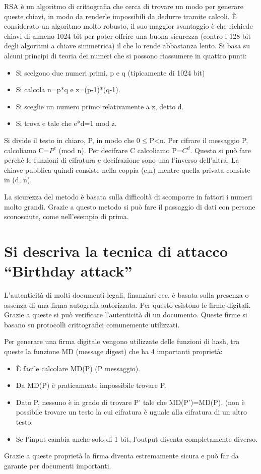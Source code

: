 RSA è un algoritmo di crittografia che cerca di trovare un modo per generare queste chiavi, in modo da renderle impossibili da dedurre tramite calcoli.
È considerato un algoritmo molto robusto, il suo maggior svantaggio è che richiede chiavi di almeno 1024 bit per poter offrire una buona sicurezza (contro i 128 bit degli algoritmi a chiave simmetrica) il che lo rende abbastanza lento.
Si basa su alcuni principi di teoria dei numeri che si possono riassumere in quattro punti:
\begin{itemize}
\item	Si scelgono due numeri primi, p e q (tipicamente di 1024 bit)
\item	Si calcola n=p*q    e   z=(p-1)*(q-1).
\item	Si sceglie un numero primo relativamente a z, detto d.
\item	Si trova e tale che e*d=1 mod z.
\end{itemize}

Si divide il testo in chiaro, P, in modo che 0$\leq$P<n. Per cifrare il messaggio P, calcoliamo C=$P^e$ (mod n). Per decifrare C calcoliamo P=$C^d$. Questo si può fare perché le funzioni di cifratura e decifrazione sono una l’inverso dell’altra.
La chiave pubblica quindi consiste nella coppia (e,n) mentre quella privata consiste in (d, n).

La sicurezza del metodo è basata sulla difficoltà di scomporre in fattori i numeri molto grandi.
Grazie a questo metodo si può fare il passaggio di dati con persone sconosciute, come nell’esempio di prima.

\section{Si descriva la tecnica di attacco “Birthday attack”}

L’autenticità di molti documenti legali, finanziari ecc. è basata sulla presenza o assenza di una firma autografa autorizzata. Per questo esistono le firme digitali. Grazie a queste si può verificare l’autenticità di un documento. Queste firme si basano su protocolli crittografici comunemente utilizzati.

Per generare una firma digitale vengono utilizzate delle funzioni di hash, tra queste la funzione MD (message digest) che ha 4 importanti proprietà:
\begin{itemize}
\item	È facile calcolare MD(P) (P messaggio).
\item	Da MD(P) è praticamente impossibile trovare P.
\item	Dato P, nessuno è in grado di trovare P’ tale che MD(P’)=MD(P). (non è possibile trovare un testo la cui cifratura è uguale alla cifratura di un altro testo.
\item	Se l’input cambia anche solo di 1 bit, l’output diventa completamente diverso.
\end{itemize}
Grazie a queste proprietà la firma diventa estremamente sicura e può far da garante per documenti importanti.

